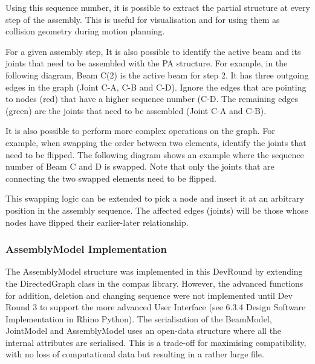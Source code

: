 Using this sequence number, it is possible to extract the partial structure at every step of the assembly. This is useful for visualisation and for using them as collision geometry during motion planning.

For a given assembly step, It is also possible to identify the active beam and its joints that need to be assembled with the PA structure. For example, in the following diagram, Beam C(2) is the active beam for step 2. It has three outgoing edges in the graph (Joint C-A, C-B and C-D). Ignore the edges that are pointing to nodes (red) that have a higher sequence number (C-D. The remaining edges (green) are the joints that need to be assembled (Joint C-A and C-B). 

It is also possible to perform more complex operations on the graph. For example, when swapping the order between two elements, identify the joints that need to be flipped. The following diagram shows an example where the sequence number of Beam C and D is swapped. Note that only the joints that are connecting the two swapped elements need to be flipped.

This swapping logic can be extended to pick a node and insert it at an arbitrary position in the assembly sequence.  The affected edges (joints) will be those whose nodes have flipped their earlier-later relationship. 

\subsubsection{AssemblyModel Implementation}
The AssemblyModel structure was implemented in this DevRound by extending the DirectedGraph class in the compas library. However, the advanced functions for addition, deletion and changing sequence were not implemented until Dev Round 3 to support the more advanced User Interface (see 6.3.4 Design Software Implementation in Rhino Python).
The serialisation of the BeamModel, JointModel and AssemblyModel uses an open-data structure where all the internal attributes are serialised. This is a trade-off for maximising compatibility, with no loss of computational data but resulting in a rather large file. 

